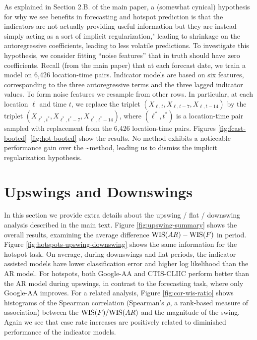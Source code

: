 \documentclass[9pt,twoside,lineno]{pnas-new}
\begin{document}
As explained in Section 2.B. of the main paper, a (somewhat cynical)
hypothesis for why we see benefits in forecasting and hotspot prediction
is that the indicators are not actually providing useful information but
they are instead simply acting as a sort of implicit regularization,"
leading to shrinkage on the autoregressive coefficients, leading to less
volatile predictions. To investigate this hypothesis, we consider
fitting ``noise features'' that in truth should have zero coefficients.
Recall (from the main paper) that at each forecast date, we train a
model on 6,426 location-time pairs. Indicator models are based on six
features, corresponding to the three autoregressive terms and the three
lagged indicator values. To form noise features we resample from other
rows. In particular, at each location \(\ell\) and time \(t\), we
replace the triplet \((X_{\ell,t}, X_{\ell,t-7}, X_{\ell,t-14})\) by the
triplet \((X_{\ell^*,t^*}, X_{\ell^*,t^*-7}, X_{\ell^*,t^*-14})\), where
\((\ell^*,t^*)\) is a location-time pair sampled with replacement from
the 6,426 location-time pairs. Figures
\ref{fig:fcast-booted}--\ref{fig:hot-booted} show the results. No method
exhibits a noticeable performance gain over the
\ar\textasciitilde method, leading us to dismiss the implicit
regularization hypothesis.


\hypertarget{upswings-and-downswings}{%
\section{Upswings and Downswings}\label{upswings-and-downswings}}

In this section we provide extra details about the upswing / flat /
downswing analysis described in the main text. Figure
\ref{fig:upswing-summary} shows the overall results, examining the
average difference \(\mathrm{WIS}(AR) - \mathrm{WIS}(F)\) in period. Figure
\ref{fig:hotspots-upswing-downswing} shows the same information for the
hotspot task. On average, during downswings and flat periods, the
indicator-assisted models have lower classification error and higher log
likelihood than the AR model. For hotspots, both Google-AA and
CTIS-CLIIC perform better than the AR model during upswings, in contrast
to the forecasting task, where only Google-AA improves. For a related
analysis, Figure \ref{fig:cor-wis-ratio} shows histograms of the
Spearman correlation (Spearman's \(\rho\), a rank-based measure of
association) between the \(\mathrm{WIS}(F)/\mathrm{WIS}(AR)\) and the magnitude of the
swing. Again we see that case rate increases are positively related to
diminished performance of the indicator models.
\end{document}

